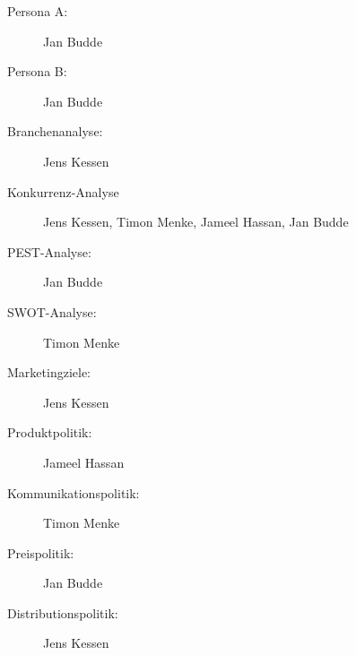 \begin{description}
\item[Persona A:] Jan Budde
\item[Persona B:] Jan Budde
\item[Branchenanalyse:] Jens Kessen 
\item[Konkurrenz-Analyse] Jens Kessen, Timon Menke, Jameel Hassan, Jan Budde 
\item[PEST-Analyse:] Jan Budde
\item[SWOT-Analyse:] Timon Menke
\item[Marketingziele:] Jens Kessen
\item[Produktpolitik:] Jameel Hassan
\item[Kommunikationspolitik:] Timon Menke
\item[Preispolitik:] Jan Budde
\item[Distributionspolitik:] Jens Kessen      
\end{description}
